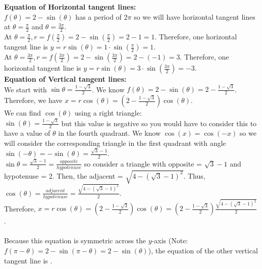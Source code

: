 \documentclass[handout]{ximera}
\begin{document}
\begin{problem}
\begin{freeResponse}
		\textbf{Equation of Horizontal tangent lines:}\\
		$f(\theta) = 2 - \sin(\theta)$ has a period of $2\pi$ so we will have horizontal tangent lines at $\theta = \frac{\pi}{2}$ and $\theta = \frac{3\pi}{2}$.  \\
		
		At $\theta = \frac{\pi}{2}, r = f\left( \frac{\pi}{2} \right) = 2 - \sin \left( \frac{\pi}{2} \right) = 2 -1 = 1$.  Therefore, one horizontal tangent line is $y=r\sin(\theta) = 1 \cdot \sin \left( \frac{\pi}{2} \right) = 1$. \\
		
	    At $\theta = \frac{3\pi}{2}, r = f\left( \frac{3\pi}{2} \right) = 2 - \sin \left( \frac{3\pi}{2} \right) = 2 - (-1) = 3$.  Therefore, one horizontal tangent line is $y=r\sin(\theta) = 3 \cdot \sin \left( \frac{3\pi}{2} \right) = -3$. \\
	    
	    \textbf{Equation of Vertical tangent lines:}\\
	    We start with $\sin \theta = \frac{1-\sqrt{3}}{2}$.  
	    We know $f(\theta) = 2 - \sin(\theta) = 2 -  \frac{1-\sqrt{3}}{2}$.  
	    Therefore, we have $x=r\cos(\theta) = \left(2 -  \frac{1-\sqrt{3}}{2} \right) \cos(\theta)$. \\  
	    We can find $\cos(\theta)$ using a right triangle:\\
	    $\sin(\theta) =  \frac{1-\sqrt{3}}{2}$ but this value is negative so you would have to consider this to have a value of $\theta$ in the fourth quadrant.  We know $\cos(x) = \cos(-x)$ so we will consider the corresponding triangle in the first quadrant with angle $\sin(-\theta) = -\sin(\theta) = \frac{\sqrt{3}-1}{2}$. \\
	    $\sin \theta = \frac{\sqrt{3}-1}{2} = \frac{opposite}{hypotenuse}$ 
	    so consider a triangle with opposite = $\sqrt{3}-1$ and hypotenuse = 2. 
	    Then, the adjacent = $\sqrt{4-(\sqrt{3}-1)^2}$.  
	    Thus, $\cos(\theta)  = \frac{adjacent}{hypotenuse} = \frac{\sqrt{4-(\sqrt{3}-1)^2}}{2}$.  \\
	    Therefore, $x=r\cos(\theta) = \left(2 -  \frac{1-\sqrt{3}}{2} \right) \cos(\theta) = \left(2 -  \frac{1-\sqrt{3}}{2} \right) \frac{\sqrt{4-(\sqrt{3}-1)^2}}{2}$. \\ 
 \\

	    Because this equation is symmetric across the $y$-axis (Note: $f(\pi-\theta)=2-\sin(\pi -\theta) = 2-\sin(\theta)$), the equation of the other vertical tangent line is .
	    
		
		
		
	\end{freeResponse}
	
\end{problem}
\end{document}
